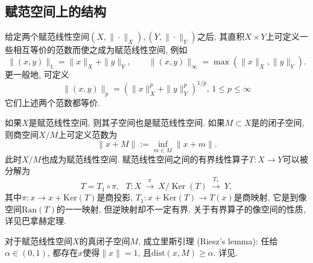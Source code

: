 \subsection{赋范空间上的结构}
给定两个赋范线性空间$(X,\|\cdot\|_X),(Y,\|\cdot\|_Y)$之后, 其直积$X\times Y$上可定义一些相互等价的范数而使之成为赋范线性空间, 例如
$$
\|(x,y)\|_{1}=\|x\|_X+\|y\|_Y,\qquad \|(x,y)\|_{\infty }=\max(\|x\|_X,\|y\|_Y).
$$
更一般地, 可定义
$$
\|(x,y)\|_{p}=\left(\|x\|_X^p+\|y\|_Y^p\right)^{1/p},\,1\leq p\leq\infty
$$
它们上述两个范数都等价.

如果$X$是赋范线性空间, 则其子空间也是赋范线性空间. 如果$M\subset X$是的闭子空间, 则商空间$X/M$上可定义范数为
$$
\|x+M\|:=\inf \limits _{m\in M}\|x+m\|.
$$
此时$X/M$也成为赋范线性空间. 赋范线性空间之间的有界线性算子$T:X\to Y$可以被分解为
$$
T=T_{1}\circ \pi ,\ \ \ T:X\ {\overset {\pi }{\longrightarrow }}\ X/\operatorname {Ker} (T)\ {\overset {T_{1}}{\longrightarrow }}\ Y,
$$
其中$\pi:x\to x+\text{Ker}(T)$是商投影, $T_1:x+\text{Ker}(T)\to T(x)$是商映射, 它是到像空间$\text{Ran}(T)$的一一映射, 但逆映射却不一定有界. 关于有界算子的像空间的性质, 详见巴拿赫定理. %

对于赋范线性空间$X$的真闭子空间$M$, 成立里斯引理 (Riesz's lemma): 任给$\alpha\in(0,1)$, 都存在$x$使得$\|x\|=1$, 且$\text{dist}(x,M)\geq\alpha$. 详见.

